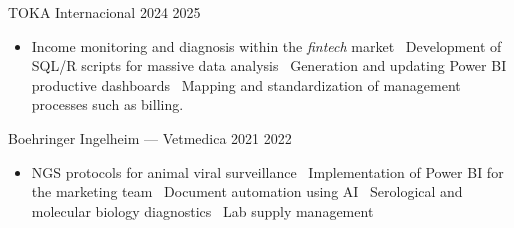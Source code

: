 \documentclass{simplecv}
\newcommand{\mydot}{\raisebox{0.5 ex}{.}\ }
\begin{document}

    {TOKA Internacional}
    {}
    {2024}
    {2025}
    {
     \vspace{-11pt}
     \begin{itemize}[leftmargin=*]
     \setlength{\itemsep}{0cm}
         \item Income monitoring and diagnosis within the \textit{fintech} market \mydot Development of SQL/R scripts for massive data analysis \mydot Generation and updating Power BI productive dashboards \mydot Mapping and standardization of management processes such as billing.
     \end{itemize}
    }


        {Boehringer Ingelheim --- Vetmedica}
        {}
        {2021}
        {2022}
        {%
            \vspace{-11pt}
            \begin{itemize}[leftmargin=*]
            \setlength{\itemsep}{0cm}
                \item NGS protocols for animal viral surveillance \mydot Implementation of Power BI for the marketing team \mydot Document automation using AI \mydot Serological and molecular biology diagnostics \mydot Lab supply management
            \end{itemize}
        }
\end{document}
